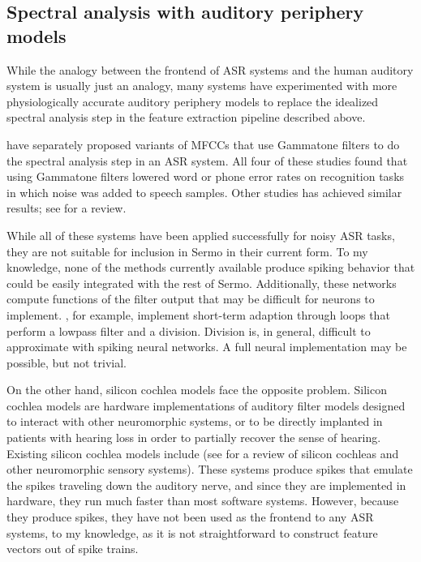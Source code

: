 \subsection{Spectral analysis with auditory periphery models}

While the analogy
between the frontend of ASR systems
and the human auditory system
is usually just an analogy,
many systems have experimented with
more physiologically accurate
auditory periphery models
to replace the idealized spectral analysis step
in the feature extraction pipeline described above.

\citet{tchorz1999,dimitriadis2005,schluter2007,shao2009}
have separately proposed variants of MFCCs
that use Gammatone filters
to do the spectral analysis step in an ASR system.
All four of these studies
found that using Gammatone filters
lowered word or phone error rates
on recognition tasks in which
noise was added to speech samples.
Other studies has achieved similar results;
see \citet{stern2012} for a review.

While all of these systems
have been applied successfully
for noisy ASR tasks,
they are not suitable
for inclusion in Sermo in their current form.
To my knowledge,
none of the methods currently available
produce spiking behavior that could
be easily integrated with the rest of Sermo.
Additionally, these networks compute
functions of the filter output that
may be difficult for neurons to implement.
\citet{tchorz1999}, for example,
implement short-term adaption
through loops that perform
a lowpass filter and a division.
Division is, in general,
difficult to approximate with spiking neural networks.
A full neural implementation
may be possible,
but not trivial.

On the other hand,
silicon cochlea models face the opposite problem.
Silicon cochlea models are hardware implementations
of auditory filter models
designed to interact with other neuromorphic systems,
or to be directly implanted in
patients with hearing loss
in order to partially recover the sense of hearing.
Existing silicon cochlea models include
\citet{chan2007,hamilton2008,wen2009,karuppuswamy2013}
(see \citealt{liu2010} for a review of
silicon cochleas
and other neuromorphic sensory systems).
These systems produce spikes
that emulate the spikes
traveling down the auditory nerve,
and since they are implemented in hardware,
they run much faster than most software systems.
However, because they produce spikes,
they have not been used
as the frontend to any ASR systems,
to my knowledge,
as it is not straightforward to
construct feature vectors
out of spike trains.

